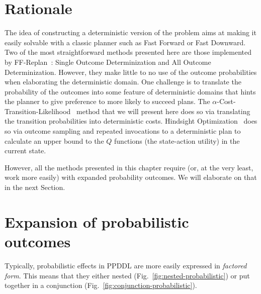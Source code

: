 \documentclass[../root.tex]{subfiles}
\begin{document}
\section{Rationale}

The idea of constructing a deterministic version of the problem
aims at making it easily solvable with a classic planner such as
Fast Forward or Fast Downward. Two of the most straightforward methods
presented here are those implemented by FF-Replan~\cite{yoon2007ffreplan}:
Single Outcome Determinization and All Outcome Determinization.
However, they make little to no use of the outcome probabilities when
elaborating the deterministic domain. One challenge is to
translate the probability of the outcomes into some feature
of deterministic domains that hints the planner to give
preference to more likely to
succeed plans. The $\alpha$-Cost-Transition-Likelihood~\cite{kaelbling2013integrated}
method that
we will present here does so via translating the transition probabilities
into deterministic costs.
Hindsight
Optimization~\cite{yoon2008probabilistic,yoon2010improving} does so
via outcome
sampling and repeated invocations to a deterministic plan to calculate
an upper bound to the $ Q $ functions (the state-action utility) in the
current state.

However, all the methods presented in this chapter require (or, at the
very least, work more easily) with expanded probability outcomes. We
will elaborate on that in the next Section.

\section{Expansion of probabilistic outcomes}

Typically, probabilistic effects in PPDDL are more easily expressed in
\emph{factored form}. This means that they either nested
(Fig.~\ref{fig:nested-probabilistic}) or put together
in a conjunction (Fig.~\ref{fig:conjunction-probabilistic}).
\end{document}
